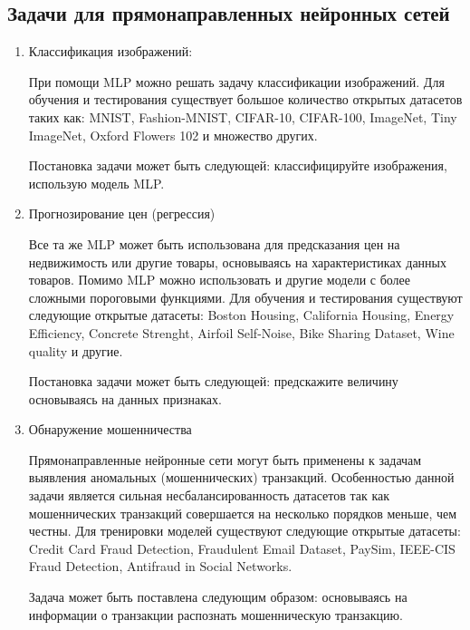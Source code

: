 \subsection{Задачи для прямонаправленных нейронных сетей}
\begin{enumerate}
\item Классификация изображений:

При помощи MLP можно решать задачу классификации изображений. Для обучения и тестирования
существует большое количество открытых датасетов таких как: MNIST, Fashion-MNIST, CIFAR-10,
CIFAR-100, ImageNet, Tiny ImageNet, Oxford Flowers 102 и множество других.

Постановка задачи может быть следующей: классифицируйте изображения, использую модель MLP.

\item Прогнозирование цен (регрессия)

Все та же MLP может быть использована для предсказания цен на недвижимость или другие товары,
основываясь на характеристиках данных товаров. Помимо MLP можно использовать и другие модели с
более сложными пороговыми функциями. Для обучения и тестирования существуют следующие открытые
датасеты: Boston Housing, California Housing, Energy Efficiency, Concrete Strenght, Airfoil
Self-Noise, Bike Sharing Dataset, Wine quality и другие.

Постановка задачи может быть следующей: предскажите величину основываясь на данных признаках.

\item Обнаружение мошенничества

Прямонаправленные нейронные сети могут быть применены к задачам выявления аномальных
(мошеннических) транзакций. Особенностью данной задачи является сильная несбалансированность
датасетов так как мошеннических транзакций совершается на несколько порядков меньше, чем
честны. Для тренировки моделей существуют следующие открытые датасеты: Credit Card Fraud
Detection, Fraudulent Email Dataset, PaySim, IEEE-CIS Fraud Detection, Antifraud in Social
Networks.

Задача может быть поставлена следующим образом: основываясь на информации о транзакции распознать
мошенническую транзакцию.
\end{enumerate}

